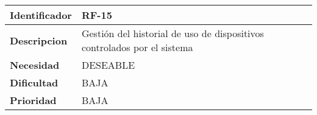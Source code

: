 \begin{center}
    \begin{tabular}{|p{2.6cm}|p{12cm}|}
    \hline
    \textbf{Identificador} & RF-15\\
    \hline
    \textbf{Descripcion} & Gestión del historial de uso de dispositivos controlados por el sistema\\
    \hline
    \textbf{Necesidad} & DESEABLE\\
    \hline
    \textbf{Dificultad} & BAJA\\
    \hline
    \textbf{Prioridad} & BAJA\\
    \hline
    \end{tabular}
\end{center}
